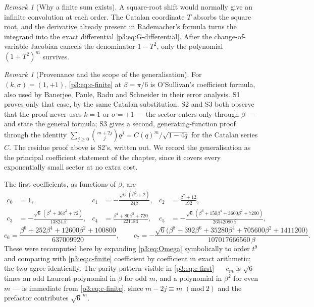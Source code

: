 \documentclass[11pt,a4paper,oneside]{book}
\theoremstyle{plain}
\theoremstyle{definition}
\theoremstyle{remark}
\newtheorem{remark}[theorem]{Remark}
\begin{document}
\begin{remark}[Why a finite sum exists]\label{p3:rem:why-finite}
A square-root shift would normally give an infinite convolution at each order. The Catalan
coordinate $T$ absorbs the square root, and the derivative already present in Rademacher's formula
turns the integrand into the exact differential \cref{p3:eq:G-differential}. After the
change-of-variable Jacobian cancels the denominator $1-T^{2}$, only the polynomial $(1+T^{2})^{m}$
survives.
\end{remark}

\begin{remark}[Provenance and the scope of the generalisation]
\label{p3:rem:osullivan}
For $(k,\sigma)=(1,+1)$, \cref{p3:eq:c-finite} at $\beta=\pi/6$ is O'Sullivan's coefficient
formula, also used by Banerjee, Paule, Radu and Schneider in their error analysis. S1 proves only
that case, by the same Catalan substitution. S2 and S3 both observe that the proof never uses
$k=1$ or $\sigma=+1$ --- the sector enters only through $\beta$ --- and state the general formula;
S3 gives a second, generating-function proof through the identity
$\sum_{j\ge0}\binom{m+2j}{j}q^{j}=C(q)^{m}/\sqrt{1-4q}$ for the Catalan series $C$. The residue
proof above is S2's, written out. We record the generalisation as the principal coefficient
statement of the chapter, since it covers every exponentially small sector at no extra cost.
\end{remark}

The first coefficients, as functions of $\beta$, are
\begin{align}
 c_{0}&=1, &
 c_{1}&=-\frac{\sqrt6\,(\beta^{2}+2)}{24\beta}, &
 c_{2}&=\frac{\beta^{2}+12}{192},\nonumber\\
 c_{3}&=-\frac{\sqrt6\,(\beta^{4}+36\beta^{2}+72)}{13824\,\beta}, &
 c_{4}&=\frac{\beta^{4}+80\beta^{2}+720}{221184}, &
 c_{5}&=-\frac{\sqrt6\,(\beta^{6}+150\beta^{4}+3600\beta^{2}+7200)}
 {26542080\,\beta},\label{p3:eq:c-first}
\end{align}
\begin{equation}\label{p3:eq:c-six}
 c_{6}=\frac{\beta^{6}+252\beta^{4}+12600\beta^{2}+100800}{637009920},
 \qquad
 c_{7}=-\frac{\sqrt6\bigl(\beta^{8}+392\beta^{6}+35280\beta^{4}
 +705600\beta^{2}+1411200\bigr)}{107017666560\,\beta}.
\end{equation}
These were recomputed here by expanding \cref{p3:eq:Omega} symbolically to order $t^{9}$ and
comparing with \cref{p3:eq:c-finite} coefficient by coefficient in exact arithmetic; the two agree
identically. The parity pattern visible in \cref{p3:eq:c-first} --- $c_{m}$ is $\sqrt6$ times an
odd Laurent polynomial in $\beta$ for odd $m$, and a polynomial in $\beta^{2}$ for even $m$ --- is
immediate from \cref{p3:eq:c-finite}, since $m-2j\equiv m$ $(\mathrm{mod}\ 2)$ and the prefactor
contributes $\sqrt6^{\,m}$.
\end{document}

